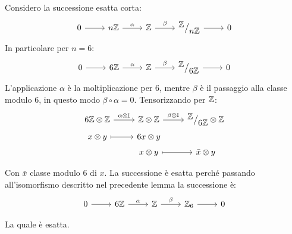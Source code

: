 \begin{example}
  Considero la successione esatta corta:
  \[
    \begin{tikzcd}
      0 \rar{} & n \Z \rar{\alpha} & \Z \rar{\beta} & \quot{\Z}{n \Z} \rar & 0
    \end{tikzcd}
  \]
  In particolare per $ n = 6 $:
  \[
    \begin{tikzcd}
      0 \rar{} & 6 \Z \rar{\alpha} & \Z \rar{\beta} & \quot{\Z}{6 \Z} \rar & 0
    \end{tikzcd}
  \]
  L'applicazione $ \alpha $ è la moltiplicazione per $ 6 $, mentre $ \beta $ è il passaggio
  alla classe modulo $ 6 $, in questo modo $ \beta \circ \alpha = 0 $. Tensorizzando per $ \mathbb{Z} $:
  \[
    \begin{tikzcd}[nodes = {row sep = 3pt}]
      6 \Z \otimes \Z \rar{\alpha \otimes \Id{}} & \Z \otimes \Z \rar{\beta \otimes \Id{}} & \quot{\Z}{6 \Z} \otimes \Z  \\
      x \otimes y \rar[mapsto] & 6x \otimes y  & {} \\
      {} & x \otimes y \rar[mapsto] & \bar{x} \otimes y \\
    \end{tikzcd}
  \]
  Con $ \bar{x} $ classe modulo 6 di $ x $. La successione è esatta perché
  passando all'isomorfismo descritto nel precedente lemma la successione è:
  \[
    \begin{tikzcd}[nodes = {row sep = 3pt}]
      0 \rar{} & 6 \Z \rar{\alpha} & \Z \rar{\beta} & \Z_6 \rar & 0 \\
    \end{tikzcd}
  \]
  La quale è esatta.
\end{example}
